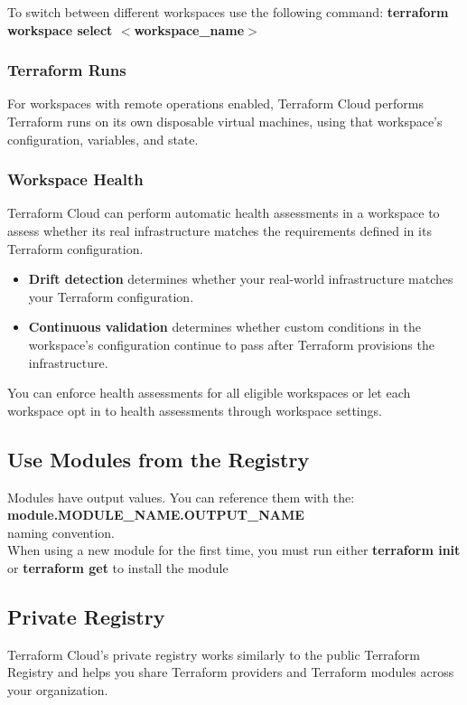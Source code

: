 \documentclass[12pt, letterpaper, twoside]{article}
\begin{document}
To switch between different workspaces use the following command:
\textbf{terraform workspace select $<$workspace\_name$>$}

\subsubsection{Terraform Runs}
For workspaces with remote operations enabled, Terraform Cloud performs Terraform runs on its own disposable 
virtual machines, using that workspace's configuration, variables, and state.

\subsubsection{Workspace Health}
Terraform Cloud can perform automatic health assessments in a workspace to assess whether its real 
infrastructure matches the requirements defined in its Terraform configuration.

\begin{itemize}
	\item \textbf{Drift detection} determines whether your real-world infrastructure matches your 
		Terraform configuration.
	\item \textbf{Continuous validation} determines whether custom conditions in the workspace’s 
		configuration continue to pass after Terraform provisions the infrastructure.
\end{itemize}

You can enforce health assessments for all eligible workspaces or let each workspace opt in to health 
assessments through workspace settings. 

\subsection{Use Modules from the Registry}
Modules have output values. You can reference them with the: \\ \textbf{module.MODULE\_NAME.OUTPUT\_NAME}\\
naming convention.\\

When using a new module for the first time, you must run either \textbf{terraform init} or 
\textbf{terraform get} to install the module

\subsection{Private Registry}
Terraform Cloud's private registry works similarly to the public Terraform Registry and helps you share 
Terraform providers and Terraform modules across your organization.
\end{document}
